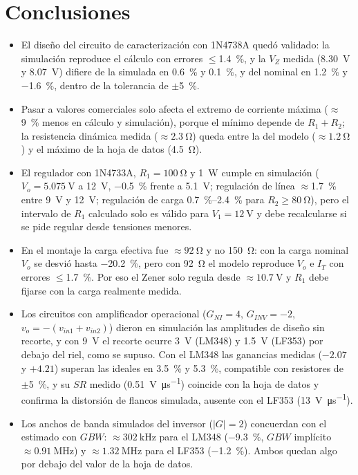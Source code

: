 \documentclass[9pt, conference]{IEEEtran}
\newcommand{\qV}[1]{\SI{#1}{\volt}}
\newcommand{\qohm}[1]{\SI{#1}{\ohm}}
\newcommand{\qW}[1]{\SI{#1}{\watt}}
\newcommand{\pct}[1]{\SI{#1}{\percent}}
\begin{document}
\section{Conclusiones}
\begin{itemize}
\item El diseño del circuito de caracterización con 1N4738A quedó validado: la simulación reproduce el cálculo con errores $\le$\pct{1.4}, y la $V_Z$ medida (\qV{8.30} y \qV{8.07}) difiere de la simulada en \pct{+0.6} y \pct{+0.1}, y del nominal en \pct{+1.2} y \pct{-1.6}, dentro de la tolerancia de $\pm$\pct{5}.
\item Pasar a valores comerciales solo afecta el extremo de corriente máxima ($\approx$\pct{9} menos en cálculo y simulación), porque el mínimo depende de $R_1+R_2$; la resistencia dinámica medida ($\approx\qohm{2.3}$) queda entre la del modelo ($\approx\qohm{1.2}$) y el máximo de la hoja de datos (\qohm{4.5}).
\item El regulador con 1N4733A, $R_1=\qohm{100}$ y \qW{1} cumple en simulación ($V_o=\qV{5.075}$ a \qV{12}, \pct{-0.5} frente a \qV{5.1}; regulación de línea $\approx$\pct{1.7} entre \qV{9} y \qV{12}; regulación de carga \pct{0.7}--\pct{2.4} para $R_2\ge\qohm{80}$), pero el intervalo de $R_1$ calculado solo es válido para $V_1=\qV{12}$ y debe recalcularse si se pide regular desde tensiones menores.
\item En el montaje la carga efectiva fue $\approx\qohm{92}$ y no \qohm{150}: con la carga nominal $V_o$ se desvió hasta \pct{-20.2}, pero con \qohm{92} el modelo reproduce $V_o$ e $I_T$ con errores $\le$\pct{1.7}. Por eso el Zener solo regula desde $\approx\qV{10.7}$ y $R_1$ debe fijarse con la carga realmente medida.
\item Los circuitos con amplificador operacional ($G_{NI}=4$, $G_{INV}=-2$, $v_o=-(v_{in1}+v_{in2})$) dieron en simulación las amplitudes de diseño sin recorte, y con \qV{9} el recorte ocurre \qV{3} (LM348) y \qV{1.5} (LF353) por debajo del riel, como se supuso. Con el LM348 las ganancias medidas ($-2.07$ y $+4.21$) superan las ideales en \pct{3.5} y \pct{5.3}, compatible con resistores de $\pm$\pct{5}, y su $SR$ medido (\SI{0.51}{\volt\per\micro\second}) coincide con la hoja de datos y confirma la distorsión de flancos simulada, ausente con el LF353 (\SI{13}{\volt\per\micro\second}).
\item Los anchos de banda simulados del inversor ($|G|=2$) concuerdan con el estimado con $GBW$: $\approx\SI{302}{\kilo\hertz}$ para el LM348 (\pct{-9.3}, $GBW$ implícito $\approx\SI{0.91}{\mega\hertz}$) y $\approx\SI{1.32}{\mega\hertz}$ para el LF353 (\pct{-1.2}). Ambos quedan algo por debajo del valor de la hoja de datos.
\end{itemize}
\end{document}
